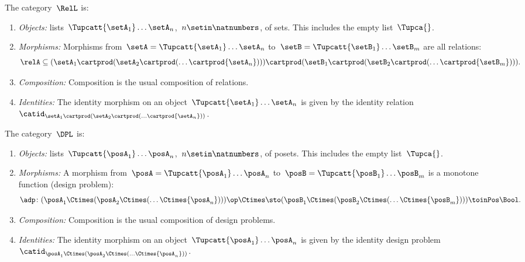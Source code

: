 {    \begin{definition}
        \label{def:RelL}
        The category~$\RelL$ is:
        \begin{enumerate}
            \item \emph{Objects:} lists~$\Tupcatt {\setA_1}  \dots {\setA_n}$,~$n \setin \natnumbers$, of sets.
                  This includes the empty list~$\Tupca {}$.
            \item \emph{Morphisms:}
                  Morphisms from~$\setA =\Tupcatt {\setA_1}  \dots {\setA_n}$ to~$\setB = \Tupcatt {\setB_1} \dots {\setB_m}$ are all relations:
                  \begin{equation*}
                      \relA\subseteq ({\setA_1} \cartprod (\setA_2 \cartprod (\ldots \cartprod {\setA_n}))) \cartprod ({\setB_1} \cartprod (\setB_2 \cartprod (\ldots \cartprod {\setB_m}))).
                  \end{equation*}
            \item \emph{Composition:}
                  Composition is the usual composition of relations.
            \item \emph{Identities:}
                  The identity morphism on an object~$\Tupcatt {\setA_1} \dots {\setA_n}$ is given by the identity relation~$\catid_{{\setA_1} \cartprod (\setA_2 \cartprod (\ldots \cartprod {\setA_n}))}$.
        \end{enumerate}
    \end{definition}

    \begin{definition}
        \label{def:DPL}
        The category~$\DPL$ is:
        \begin{enumerate}
            \item \emph{Objects:} lists~$\Tupcatt {\posA_1}  \dots {\posA_n}$,~$n \setin \natnumbers$, of posets.
                  This includes the empty list~$\Tupca {}$.
            \item \emph{Morphisms:}
                  A morphism from~$\posA =\Tupcatt {\posA_1}  \dots {\posA_n}$ to~$\posB = \Tupcatt {\posB_1} \dots {\posB_m}$ is a monotone function (design problem):
                  \begin{equation*}
                      \adp\colon ({\posA_1} \Ctimes (\posA_2 \Ctimes (\ldots \Ctimes {\posA_n})))\op \Ctimes  \sto ({\posB_1} \Ctimes (\posB_2 \Ctimes (\ldots \Ctimes {\posB_m})))\toinPos \Bool.
                  \end{equation*}
            \item \emph{Composition:}
                  Composition is the usual composition of design problems.
            \item \emph{Identities:}
                  The identity morphism on an object~$\Tupcatt {\posA_1} \dots {\posA_n}$ is given by the identity design problem~$\catid_{{\posA_1} \Ctimes (\posA_2 \Ctimes (\ldots \Ctimes {\posA_n}))}$.
        \end{enumerate}
    \end{definition}

    

}

